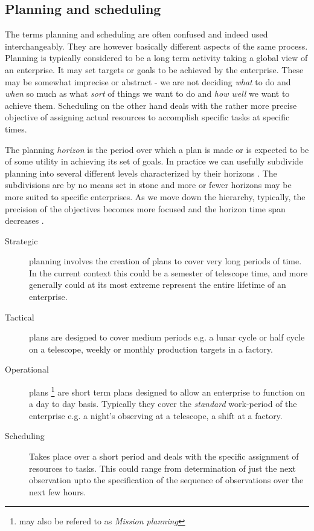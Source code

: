

\subsection{Planning and scheduling}
\label{sect:pandstimescales}
The terms planning and scheduling are often confused and indeed used interchangeably. They are however basically different aspects of the same process.
Planning is typically considered to be a long term activity taking a global view of an enterprise. It may set targets or goals to be achieved by the enterprise. These may be somewhat imprecise or abstract - we are not deciding \emph{what} to do and \emph{when} so much as what \emph{sort} of things we want to do and \emph{how well} we want to achieve them. Scheduling on the other hand deals with the rather more precise objective of assigning actual resources to accomplish specific tasks at specific times.

The planning \emph{horizon} is the period over which a plan is made or is expected to be of some utility in achieving its set of goals. In practice we can usefully subdivide planning into several different levels characterized by their horizons \citep{haxhierarchic73}. The subdivisions are by no means set in stone and more or fewer horizons may be more suited to specific enterprises. As we move down the hierarchy, typically, the precision of the objectives becomes more focused and the horizon time span decreases \citep{chien00aspen}.

\begin{description}
\item[Strategic] planning involves the creation of plans to cover very long periods of time. In the current context this could be a semester of telescope time, and more generally could at its most extreme represent the entire lifetime of an enterprise. 
\item[Tactical] plans are designed to cover medium periods e.g. a lunar cycle or half cycle on a telescope,  weekly or monthly production targets in a factory.
\item[Operational] plans \footnote{may also be refered to as \emph{Mission planning}} are short term plans designed to allow an enterprise to function on a day to day basis. Typically they cover the \emph{standard} work-period of the enterprise e.g. a night's observing at a telescope, a shift at a factory.
\item[Scheduling] Takes place over a short period and deals with the specific assignment of resources to tasks. This could range from determination of just the next observation upto the specification of the sequence of observations over the next few hours.
\end{description}

